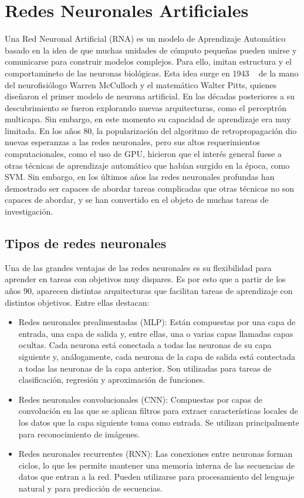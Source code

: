 \section{Redes Neuronales Artificiales}

 Una Red Neuronal Artificial (RNA) es un modelo de Aprendizaje Automático basado en la idea de que muchas unidades de cómputo pequeñas pueden unirse y comunicarse para construir modelos complejos. Para ello, imitan estructura y el comportamineto de las neuronas biológicas. Esta idea surge en 1943 ~\cite{mcculloch1943logical} de la mano del neurofisiólogo Warren McCulloch y el matemático Walter Pitts, quienes diseñaron el primer modelo de neurona artificial. En las décadas posteriores a su descubrimiento se fueron explorando nuevas arquitecturas, como el perceptrón multicapa. Sin embargo, en este momento su capacidad de aprendizaje era muy limitada. En los años 80, la popularización del algoritmo de retropropagación dio nuevas esperanzas a las redes neuronales, pero sus altos requerimientos computacionales, como el uso de GPU, hicieron que el interés general fuese a otras técnicas de aprendizaje automático que habían surgido en la época, como SVM. Sin embargo, en los últimos años las redes neuronales profundas han demostrado ser capaces de abordar tareas complicadas que otras técnicas no son capaces de abordar, y se han convertido en el objeto de muchas tareas de investigación.
 
\subsection{Tipos de redes neuronales}
Una de las grandes ventajas de las redes neuronales es su flexibilidad para aprender en tareas con objetivos muy dispares. Es por esto que a partir de los años 90, aparecen distintas arquitecturas que facilitan tareas de aprendizaje con distintos objetivos. Entre ellas destacan: 

\begin{itemize}
    \item Redes neuronales prealimentadas (MLP): Están compuestas por una capa de entrada, una capa de salida y, entre ellas, una o varias capas llamadas capas ocultas. Cada neurona está conectada a todas las neuronas de su capa siguiente y, análogamente, cada neurona de la capa de salida está contectada a todas las neuronas de la capa anterior. Son utilizadas para tareas de clasificación, regresión y aproximación de funciones. 
    \item Redes neuronales convolucionales (CNN): Compuestas por capas de convolución en las que se aplican filtros para extraer características locales de los datos que la capa siguiente toma como entrada. Se utilizan principalmente para reconocimiento de imágenes.  
    \item Redes neuronales recurrentes (RNN): Las conexiones entre neuronas forman ciclos, lo que les permite mantener una memoria interna de las secuencias de datos que entran a la red. Pueden utilizarse para procesamiento del lenguaje natural y para predicción de secuencias. 
\end{itemize}


